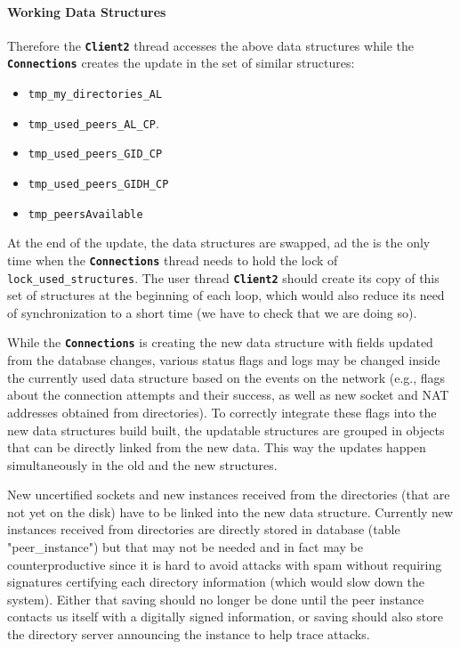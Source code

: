 \documentclass{book}
\newcommand{\cls}[1]{{\tt\bf #1}}
\newcommand{\mmb}[1]{{\tt #1}}
\begin{document}
\paragraph{Working Data Structures}
Therefore the \cls{Client2} thread accesses the above data structures while the \cls{Connections} creates the update in
the set of similar structures:
\begin{itemize}
\item
\mmb{tmp\_my\_directories\_AL}
\item
\mmb{tmp\_used\_peers\_AL\_CP}.
\item
\mmb{tmp\_used\_peers\_GID\_CP}
\item
\mmb{tmp\_used\_peers\_GIDH\_CP}
\item
\mmb{tmp\_peersAvailable}
\end{itemize}
At the end of the update, the data structures are swapped, ad the is the only time when the \cls{Connections} thread needs to 
hold the lock of \mmb{lock\_used\_structures}. The user thread \cls{Client2} should create its copy of this set of structures 
at the beginning of each loop, which would also reduce its need of synchronization to a short time (we have to check that 
we are doing so).

While the \cls{Connections} is creating the new data structure with fields updated from the database changes, various
status flags and logs may be changed inside the currently used data structure based on the events on the network
(e.g., flags about the connection attempts and their success, as well as new socket and NAT addresses 
obtained from directories). To correctly integrate these flags into the new data structures build built,
the updatable structures are grouped in objects that can be directly linked from the new data. This way the updates
happen simultaneously in the old and the new structures.

New uncertified sockets and new instances received from the directories (that are not yet on the disk) have to be 
linked into the new data structure. Currently new instances received from directories are directly stored in database (table "peer\_instance")
but that may not be needed and in fact may be counterproductive since it is hard to avoid attacks with spam
without requiring signatures certifying each directory information (which would slow down the system). Either
that saving should no longer be done until the peer instance contacts us itself with a digitally signed information,
or saving should also store the directory server announcing the instance to help trace attacks.
\end{document}
